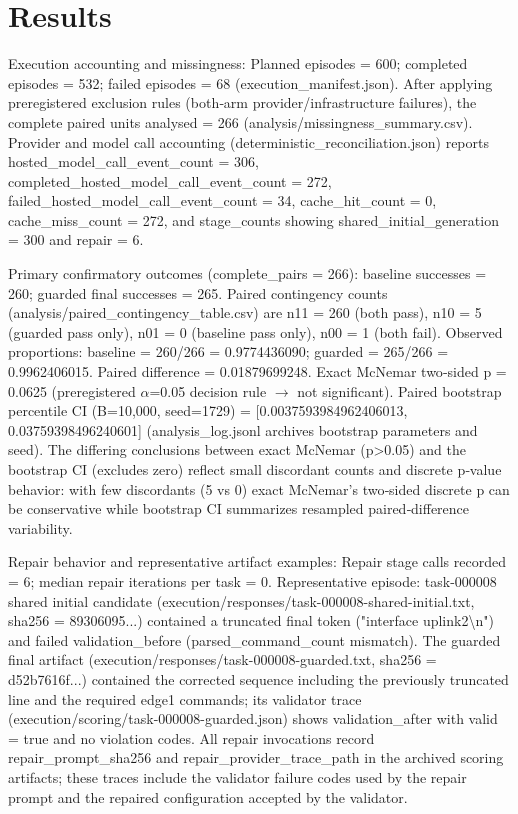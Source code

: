 \documentclass[conference]{IEEEtran}
\begin{document}
\section{Results}
Execution accounting and missingness: Planned episodes = 600; completed episodes = 532; failed episodes = 68 (execution\_manifest.json). After applying preregistered exclusion rules (both‑arm provider/infrastructure failures), the complete paired units analysed = 266 (analysis/missingness\_summary.csv). Provider and model call accounting (deterministic\_reconciliation.json) reports hosted\_model\_call\_event\_count = 306, completed\_hosted\_model\_call\_event\_count = 272, failed\_hosted\_model\_call\_event\_count = 34, cache\_hit\_count = 0, cache\_miss\_count = 272, and stage\_counts showing shared\_initial\_generation = 300 and repair = 6.

Primary confirmatory outcomes (complete\_pairs = 266): baseline successes = 260; guarded final successes = 265. Paired contingency counts (analysis/paired\_contingency\_table.csv) are n11 = 260 (both pass), n10 = 5 (guarded pass only), n01 = 0 (baseline pass only), n00 = 1 (both fail). Observed proportions: baseline = 260/266 = 0.9774436090; guarded = 265/266 = 0.9962406015. Paired difference = 0.01879699248. Exact McNemar two‑sided p = 0.0625 (preregistered \ensuremath{\alpha}=0.05 decision rule \ensuremath{\rightarrow} not significant). Paired bootstrap percentile CI (B=10,000, seed=1729) = [0.0037593984962406013, 0.03759398496240601] (analysis\_log.jsonl archives bootstrap parameters and seed). The differing conclusions between exact McNemar (p>0.05) and the bootstrap CI (excludes zero) reflect small discordant counts and discrete p‑value behavior: with few discordants (5 vs 0) exact McNemar's two‑sided discrete p can be conservative while bootstrap CI summarizes resampled paired‑difference variability.

Repair behavior and representative artifact examples: Repair stage calls recorded = 6; median repair iterations per task = 0. Representative episode: task-000008 shared initial candidate (execution/responses/task-000008-shared-initial.txt, sha256 = 89306095...) contained a truncated final token ("interface uplink2\textbackslash{}n") and failed validation\_before (parsed\_command\_count mismatch). The guarded final artifact (execution/responses/task-000008-guarded.txt, sha256 = d52b7616f...) contained the corrected sequence including the previously truncated line and the required edge1 commands; its validator trace (execution/scoring/task-000008-guarded.json) shows validation\_after with valid = true and no violation codes. All repair invocations record repair\_prompt\_sha256 and repair\_provider\_trace\_path in the archived scoring artifacts; these traces include the validator failure codes used by the repair prompt and the repaired configuration accepted by the validator.
\end{document}
